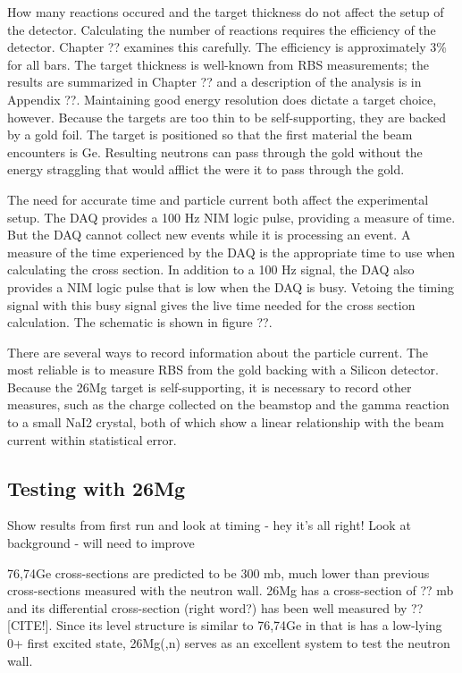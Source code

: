 How many reactions occured and the target thickness do not affect the setup of the detector.  Calculating the number of reactions requires the efficiency of the detector.  Chapter ?? examines this carefully.  The efficiency is approximately 3\% for all bars.  The target thickness is well-known from RBS measurements; the results are summarized in Chapter ?? and a description of the analysis is in Appendix ??.  Maintaining good energy resolution does dictate a target choice, however.  Because the  targets are too thin to be self-supporting, they are backed by a gold foil.  The target is positioned so that the first material the beam encounters is Ge.  Resulting neutrons can pass through the gold without the energy straggling that would afflict the  were it to pass through the gold.

The need for accurate time and particle current both affect the experimental setup.  The DAQ provides a 100 Hz NIM logic pulse, providing a measure of time.  But the DAQ cannot collect new events while it is processing an event.  A measure of the time experienced by the DAQ is the appropriate time to use when calculating the cross section.  In addition to a 100 Hz signal, the DAQ also provides a NIM logic pulse that is low when the DAQ is busy.  Vetoing the timing signal with this busy signal gives the live time needed for the cross section calculation.  The schematic is shown in figure ??.

There are several ways to record information about the particle current.  The most reliable is to measure RBS from the gold backing with a Silicon detector.  Because the 26Mg target is self-supporting, it is necessary to record other measures, such as the charge collected on the beamstop and the gamma reaction to a small NaI2 crystal, both of which show a linear relationship with the beam current within statistical error.



\subsection{Testing with 26Mg}
Show results from first run and look at timing - hey it's all right!
Look at background - will need to improve

76,74Ge cross-sections are predicted to be 300 mb, much lower than previous cross-sections measured with the neutron wall.  26Mg has a cross-section of ?? mb and its differential cross-section (right word?) has been well measured by ?? [CITE!].  Since its level structure is similar to 76,74Ge in that is has a low-lying 0+ first excited state, 26Mg(,n) serves as an excellent system to test the neutron wall.

